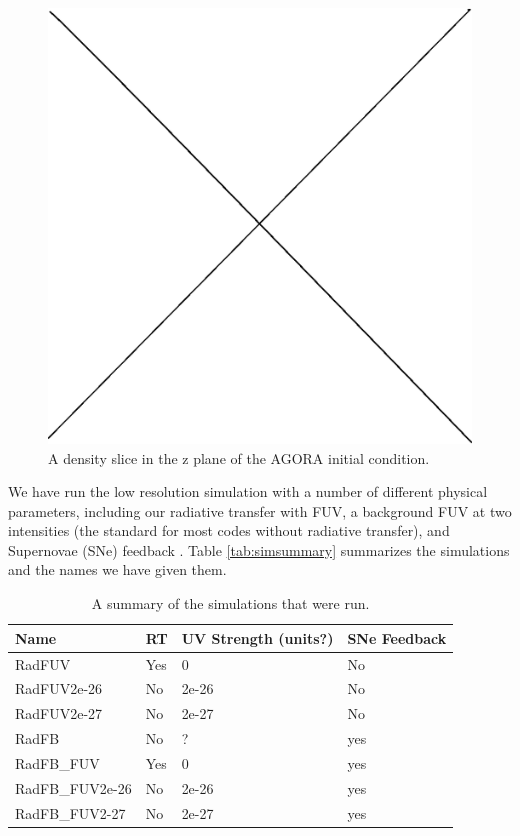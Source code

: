 \begin{figure}
\includegraphics[width=\textwidth]{graphics/placeholder.eps}
\caption[The AGORA IC]{A density slice in the z plane of the AGORA initial condition.}
\label{fig:agoraic}
\end{figure}


We have run the low resolution simulation with a number of different physical parameters, including our radiative transfer with FUV, a background FUV at two intensities (the standard for most codes without radiative transfer), and Supernovae (SNe) feedback \citep{kellerEt14}. Table \ref{tab:simsummary} summarizes the simulations and the names we have given them.

\begin{table}
\begin{tabular}{llll}
Name & RT & UV Strength (units?) & SNe Feedback\\ \hline \hline
RadFUV & Yes & 0 & No\\
RadFUV2e-26 & No & 2e-26 & No\\
RadFUV2e-27 & No & 2e-27 & No\\
RadFB & No & ? & yes\\
RadFB\_FUV & Yes & 0 & yes\\
RadFB\_FUV2e-26 & No & 2e-26 & yes\\
RadFB\_FUV2-27 & No & 2e-27 & yes\\
\hline
\end{tabular}
\caption[Summary of simulations]{A summary of the simulations that were run.}
\end{table}

